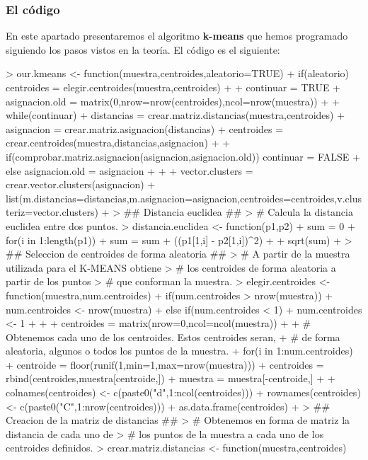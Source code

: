 \documentclass [a4paper] {article}
\begin{document}
\subsubsection{El código}
En este apartado presentaremos el algoritmo \textbf{k-means} que hemos programado siguiendo los pasos vistos en la teoría. El código es el siguiente:
\begin{footnotesize}
\begin{Schunk}
\begin{Sinput}
> our.kmeans <- function(muestra,centroides,aleatorio=TRUE){
+   if(aleatorio) centroides = elegir.centroides(muestra,centroides)
+ 
+   continuar = TRUE
+   asignacion.old = matrix(0,nrow=nrow(centroides),ncol=nrow(muestra))
+ 
+   while(continuar){
+     distancias = crear.matriz.distancias(muestra,centroides)
+     asignacion = crear.matriz.asignacion(distancias)
+     centroides = crear.centroides(muestra,distancias,asignacion)
+ 
+     if(comprobar.matriz.asignacion(asignacion,asignacion.old)) continuar = FALSE
+     else asignacion.old = asignacion
+   }
+ 
+   vector.clusters = crear.vector.clusters(asignacion)
+   list(m.distancias=distancias,m.asignacion=asignacion,centroides=centroides,v.clusteriz=vector.clusters)
+ }
> ## Distancia euclidea ##
> # Calcula la distancia euclidea entre dos puntos.
> distancia.euclidea <- function(p1,p2){
+   sum = 0
+   for(i in 1:length(p1)){
+   	sum = sum + ((p1[1,i] - p2[1,i])^2)
+   }
+   sqrt(sum)
+ }
> ## Seleccion de centroides de forma aleatoria ##
> # A partir de la muestra utilizada para el K-MEANS obtiene
> # los centroides de forma aleatoria a partir de los puntos
> # que conforman la muestra.
> elegir.centroides <- function(muestra,num.centroides){
+   if(num.centroides > nrow(muestra)){
+   	num.centroides <- nrow(muestra)
+   } else if(num.centroides < 1){
+   	num.centroides <- 1
+   }
+   
+   centroides = matrix(nrow=0,ncol=ncol(muestra))
+   
+   # Obtenemos cada uno de los centroides. Estos centroides seran,
+   # de forma aleatoria, algunos o todos los puntos de la muestra.
+   for(i in 1:num.centroides){
+     centroide = floor(runif(1,min=1,max=nrow(muestra)))
+     centroides = rbind(centroides,muestra[centroide,])
+     muestra = muestra[-centroide,]
+   }
+   colnames(centroides) <- c(paste0("d",1:ncol(centroides)))
+   rownames(centroides) <- c(paste0("C",1:nrow(centroides)))
+   as.data.frame(centroides)
+ }
> ## Creacion de la matriz de distancias ##
> # Obtenemos en forma de matriz la distancia de cada uno de
> # los puntos de la muestra a cada uno de los centroides definidos.
> crear.matriz.distancias <- function(muestra,centroides){
}
\end{Sinput}
\end{Schunk}
\end{footnotesize}
\end{document}

